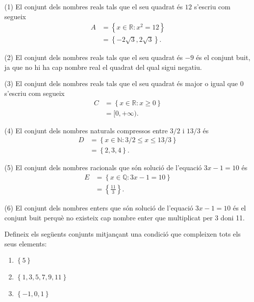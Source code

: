 \begin{solucio}
(1) El conjunt dels nombres reals tals que el seu quadrat és $12$
s'escriu com segueix%
\begin{align*}
A& =\left\{ x\in \mathbb{R}:x^{2}=12\right\} \\
& =\left\{ -2\sqrt{3},2\sqrt{3}\right\} \text{.}
\end{align*}

(2) El conjunt dels nombres reals tals que el seu quadrat és $-9$ és
el conjunt buit, ja que no hi ha cap nombre real el quadrat del qual sigui
negatiu.

(3) El conjunt dels nombres reals tals que el seu quadrat és major o
igual que $0$ s'escriu com segueix%
\begin{align*}
C& =\left\{ x\in \mathbb{R}:x\geq 0\right\} \\
& =[0,+\infty )\text{.}
\end{align*}

(4) El conjunt dels nombres naturals compressos entre $3/2$ i $13/3$ és%
\begin{align*}
D& =\left\{ x\in \mathbb{N}:3/2\leq x\leq 13/3\right\} \\
& =\left\{ 2,3,4\right\} \text{.}
\end{align*}

(5) El conjunt dels nombres racionals que són solució de l'equació $3x-1=10$ és%
\begin{align*}
E& =\left\{ x\in \mathbb{Q}:3x-1=10\right\} \\
& =\left\{ \frac{11}{3}\right\} \text{.}
\end{align*}

(6) El conjunt dels nombres enters que són solució de l'equació $%
3x-1=10$ és el conjunt buit perquè no existeix cap nombre enter que
multiplicat per $3$ doni 11.
\end{solucio}

\begin{exercici}
Defineix els següents conjunts mitjançant una condició que
compleixen tots els seus elements:

\begin{enumerate}
\item $\left\{ 5\right\} $

\item $\left\{ 1,3,5,7,9,11\right\} $

\item $\left\{ -1,0,1\right\} $
\end{enumerate}
\end{exercici}

